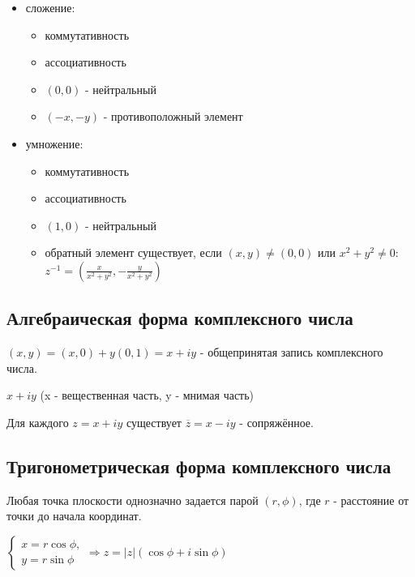 \documentclass[a4paper]{article}
\begin{document}
\begin{hproof}
\begin{itemize}
\item 
	сложение:\begin{itemize}
	\item коммутативность
	\item ассоциативность
	\item $(0,0)$ - нейтральный
	\item $(-x,-y)$ - противоположный элемент
	\end{itemize}

\item 
	умножение: \begin{itemize}
	\item коммутативность
	\item ассоциативность
	\item $(1,0)$ - нейтральный
	\item обратный элемент существует, если $(x,y) \neq (0,0)$ или $\displaystyle x^2+y^2 \neq 0$: $z^{-1} = \left( \frac{x}{x^2+y^2},-\frac{y}{x^2+y^2} \right)$
		\end{itemize}
		
		
\end{itemize}
\end{hproof}

\subsection*{Алгебраическая форма комплексного числа}
$(x,y) = (x,0) + y(0,1) = x+iy$ - общепринятая запись комплексного числа.

$x+iy$ (x - вещественная часть, y - мнимая часть)

Для каждого $z = x+iy$ существует $\overline{z} = x-iy$ - сопряжённое.

\newpage \begin{center}\begin{Large}\end{Large}\end{center}
\subsection*{Тригонометрическая форма комплексного числа}

Любая точка плоскости однозначно задается парой $(r, \phi)$, где $r$ - расстояние от точки до начала координат.

$\displaystyle \begin{cases}
x = r \cos \phi,
\\
y = r \sin \phi
\end{cases} \Rightarrow z = |z| (\cos \phi + i \sin \phi)$
\end{document}
